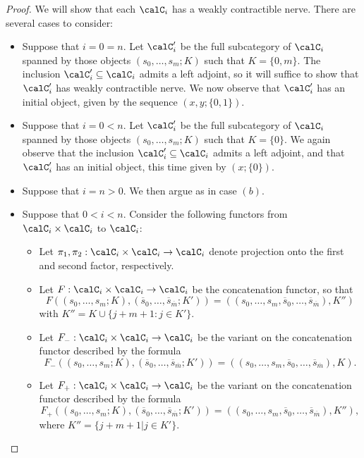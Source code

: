 \begin{proof}
We will show that each $\calC_i$ has a weakly contractible nerve. There are several cases to
consider:
\begin{itemize}
\item[$(a)$] Suppose that $i= 0 = n$. Let $\calC'_i$ be the full subcategory of $\calC_i$ spanned
by those objects $( s_0, \ldots, s_m ; K)$ such that $K = \{0, m\}$. The inclusion
$\calC'_i \subseteq \calC_i$ admits a left adjoint, so it will suffice to show that
$\calC'_i$ has weakly contractible nerve. We now observe that $\calC'_i$ has an initial object,
given by the sequence $(x,y; \{0,1\})$.
\item[$(b)$] Suppose that $i = 0 < n$. Let $\calC'_i$ be the full subcategory of $\calC_i$ spanned by those objects $(s_0, \ldots, s_m; K)$ such that $K = \{0\}$. We again observe that
the inclusion $\calC'_i \subseteq \calC_i$ admits a left adjoint, and that $\calC'_i$ has
an initial object, this time given by $(x; \{0\})$. 
\item[$(c)$] Suppose that $i = n > 0$. We then argue as in case $(b)$.
\item[$(d)$] Suppose that $0 < i < n$. Consider the following functors from $\calC_i \times \calC_i$ to
$\calC_i$:
\begin{itemize}
\item Let $\pi_1, \pi_2: \calC_i \times \calC_i \rightarrow \calC_i$ denote projection onto the first and second factor, respectively.
\item Let $F: \calC_i \times \calC_i \rightarrow \calC_i$ be the concatenation functor, so that
$$F( (s_0, \ldots, s_m; K), ( \overline{s}_0, \ldots, \overline{s}_{\overline{m}}; K'))=
( ( s_0, \ldots, s_m, \overline{s}_0, \ldots, \overline{s}_{\overline{m}}), K'')$$
with $K'' = K \cup \{ j + m + 1: j \in K' \}$.  
\item Let $F_{-}: \calC_i \times \calC_i \rightarrow \calC_i$ be the variant on the
concatenation functor described by the formula
$$F_{-}( (s_0, \ldots, s_m; K), ( \overline{s}_0, \ldots, \overline{s}_{\overline{m}}; K'))=
( ( s_0, \ldots, s_m, \overline{s}_0, \ldots, \overline{s}_{\overline{m}}), K).$$
\item Let $F_{+}: \calC_i \times \calC_i \rightarrow \calC_i$ be the variant on the
concatenation functor described by the formula
$$F_{+}( (s_0, \ldots, s_m; K), ( \overline{s}_0, \ldots, \overline{s}_{\overline{m}}; K'))=
( ( s_0, \ldots, s_m, \overline{s}_0, \ldots, \overline{s}_{\overline{m}}), K''),$$
where $K'' = \{ j + m + 1 | j \in K' \}$.
\end{itemize}

\end{itemize}
\end{proof}
